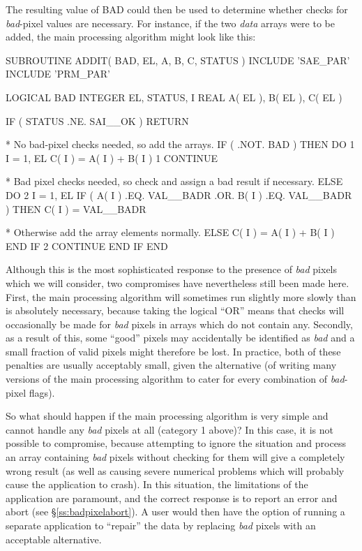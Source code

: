 \documentclass[twoside,11pt,nolof]{starlink}
\providecommand{\st}[1]{{\emph{#1}}}
\begin{document}
The resulting value of BAD could then be used to determine whether checks
for \st{bad\/}-pixel values are necessary.
For instance, if the two \st{data\/} arrays were to be added, the main
processing algorithm might look like this:

\small
\begin{terminalv}
      SUBROUTINE ADDIT( BAD, EL, A, B, C, STATUS )
      INCLUDE 'SAE_PAR'
      INCLUDE 'PRM_PAR'

      LOGICAL BAD
      INTEGER EL, STATUS, I
      REAL A( EL ), B( EL ), C( EL )

      IF ( STATUS .NE. SAI__OK ) RETURN

*  No bad-pixel checks needed, so add the arrays.
      IF ( .NOT. BAD ) THEN
         DO 1 I = 1, EL
            C( I ) = A( I ) + B( I )
 1       CONTINUE

*  Bad pixel checks needed, so check and assign a bad result if necessary.
      ELSE
         DO 2 I = 1, EL
            IF ( A( I ) .EQ. VAL__BADR .OR. B( I ) .EQ. VAL__BADR ) THEN
               C( I ) = VAL__BADR

*  Otherwise add the array elements normally.
            ELSE
               C( I ) = A( I ) + B( I )
            END IF
 2       CONTINUE
      END IF
      END
\end{terminalv}
\normalsize

Although this is the most sophisticated response to the presence of
\st{bad\/} pixels which we will consider, two compromises have
nevertheless
still been made here.
First, the main processing algorithm will sometimes run slightly more slowly
than is absolutely necessary, because taking the logical ``OR'' means that
checks will occasionally be made for \st{bad\/} pixels in arrays which do not
contain any.
Secondly, as a result of this, some ``good'' pixels may accidentally be
identified as \st{bad\/} and a small fraction of valid pixels might therefore
be lost.
In practice, both of these penalties are usually acceptably small, given the
alternative (of writing many versions of the main processing algorithm to
cater for every combination of \st{bad\/}-pixel flags).

So what should happen if the main processing algorithm is very simple and
cannot handle any \st{bad\/} pixels at all (category 1 above)?
In this case, it is not possible to compromise, because attempting to ignore
the situation and process an array containing \st{bad\/} pixels without
checking for them will give a completely wrong result (as well as causing
severe numerical problems which will probably cause the application to
crash).
In this situation, the limitations of the application are paramount, and the
correct response is to report an error and abort (see
\S\ref{ss:badpixelabort}).
A user would then have the option of running a separate application to
``repair'' the data by replacing \st{bad\/} pixels with an acceptable
alternative.
\end{document}
